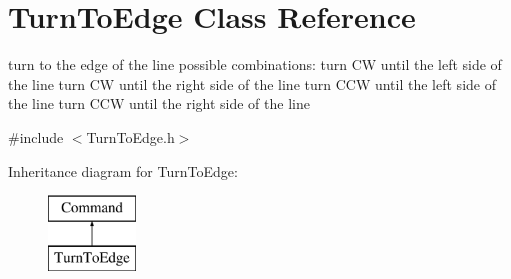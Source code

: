 \hypertarget{classTurnToEdge}{\section{Turn\-To\-Edge Class Reference}
\label{classTurnToEdge}
}


turn to the edge of the line possible combinations\-: turn C\-W until the left side of the line turn C\-W until the right side of the line turn C\-C\-W until the left side of the line turn C\-C\-W until the right side of the line  




{\ttfamily \#include $<$Turn\-To\-Edge.\-h$>$}

Inheritance diagram for Turn\-To\-Edge\-:\begin{figure}[H]
\begin{center}
\leavevmode
\includegraphics[height=2.000000cm]{classTurnToEdge}
\end{center}
\end{figure}
